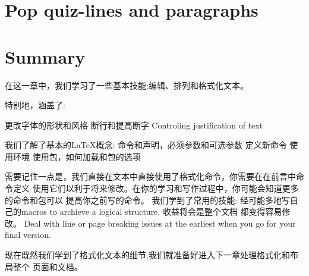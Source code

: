 \section{Pop quiz-lines and paragraphs}
\section{Summary}
在这一章中，我们学习了一些基本技能:编辑、排列和格式化文本。

特别地，涵盖了:

更改字体的形状和风格
断行和提高断字
Controling justification of text

我们了解了基本的LaTeX概念:
命令和声明，必须参数和可选参数
定义新命令
使用环境
使用包，如何加载和包的选项

需要记住一点是，我们直接在文本中直接使用了格式化命令，你需要在在前言中命令定义
使用它们以利于将来修改。在你的学习和写作过程中，你可能会知道更多的命令和包可以
提高你之前写的命令。
我们学到了常用的技能:
经可能多地写自己的macros to archieve a logical structure. 收益将会是整个文档
都变得容易修改。
Deal with line or page breaking issues at the earliest when you go for your
final version.

现在既然我们学到了格式化文本的细节,我们就准备好进入下一章处理格式化和布局整个
页面和文档。
